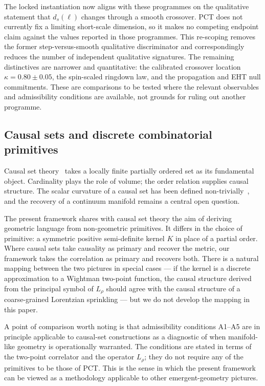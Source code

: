 ﻿\documentclass[12pt,a4paper]{article}
\theoremstyle{definition}
\begin{document}
The locked instantiation now aligns with these programmes on the qualitative statement that $d_s(\ell)$ changes through a smooth crossover. PCT does not currently fix a limiting short-scale dimension, so it makes no competing endpoint claim against the values reported in those programmes. This re-scoping removes the former step-versus-smooth qualitative discriminator and correspondingly reduces the number of independent qualitative signatures. The remaining distinctives are narrower and quantitative: the calibrated crossover location $\kappa=0.80\pm0.05$, the spin-scaled ringdown law, and the propagation and EHT null commitments. These are comparisons to be tested where the relevant observables and admissibility conditions are available, not grounds for ruling out another programme.

\subsection{Causal sets and discrete combinatorial primitives}
\label{sec:conn_causal_sets}

Causal set theory~\citep{sorkin,surya,henson,dowker,benincasa} takes a locally finite partially ordered set as its fundamental object. Cardinality plays the role of volume; the order relation supplies causal structure. The scalar curvature of a causal set has been defined non-trivially~\citep{benincasa}, and the recovery of a continuum manifold remains a central open question.

The present framework shares with causal set theory the aim of deriving geometric language from non-geometric primitives. It differs in the choice of primitive: a symmetric positive semi-definite kernel $K$ in place of a partial order. Where causal sets take causality as primary and recover the metric, our framework takes the correlation as primary and recovers both. There is a natural mapping between the two pictures in special cases --- if the kernel is a discrete approximation to a Wightman two-point function, the causal structure derived from the principal symbol of $L_\rho$ should agree with the causal structure of a coarse-grained Lorentzian sprinkling --- but we do not develop the mapping in this paper.

A point of comparison worth noting is that admissibility conditions A1--A5 are in principle applicable to causal-set constructions as a diagnostic of when manifold-like geometry is operationally warranted. The conditions are stated in terms of the two-point correlator and the operator $L_\rho$; they do not require any of the primitives to be those of PCT. This is the sense in which the present framework can be viewed as a methodology applicable to other emergent-geometry pictures.
\end{document}

